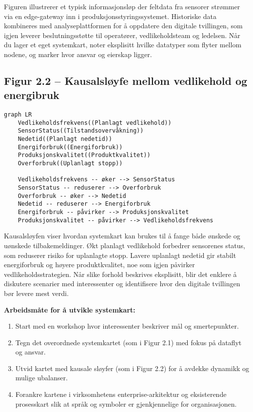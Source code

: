 Figuren illustrerer et typisk informasjonsløp der feltdata fra sensorer strømmer via en edge-gateway inn i produksjonsstyringssystemet. Historiske data kombineres med analyseplattformen for å oppdatere den digitale tvillingen, som igjen leverer beslutningsstøtte til operatører, vedlikeholdsteam og ledelsen. Når du lager et eget systemkart, noter eksplisitt hvilke datatyper som flyter mellom nodene, og marker hvor ansvar og eierskap ligger.

\subsection{Figur 2.2 -- Kausalsløyfe mellom vedlikehold og energibruk}
\begin{verbatim}
graph LR
    Vedlikeholdsfrekvens((Planlagt vedlikehold))
    SensorStatus((Tilstandsovervåkning))
    Nedetid((Planlagt nedetid))
    Energiforbruk((Energiforbruk))
    Produksjonskvalitet((Produktkvalitet))
    Overforbruk((Uplanlagt stopp))

    Vedlikeholdsfrekvens -- øker --> SensorStatus
    SensorStatus -- reduserer --> Overforbruk
    Overforbruk -- øker --> Nedetid
    Nedetid -- reduserer --> Energiforbruk
    Energiforbruk -- påvirker --> Produksjonskvalitet
    Produksjonskvalitet -- påvirker --> Vedlikeholdsfrekvens
\end{verbatim}

Kausalsløyfen viser hvordan systemkart kan brukes til å fange både ønskede og uønskede tilbakemeldinger. Økt planlagt vedlikehold forbedrer sensorenes status, som reduserer risiko for uplanlagte stopp. Lavere uplanlagt nedetid gir stabilt energiforbruk og høyere produktkvalitet, noe som igjen påvirker vedlikeholdsstrategien. Når slike forhold beskrives eksplisitt, blir det enklere å diskutere scenarier med interessenter og identifisere hvor den digitale tvillingen bør levere mest verdi.

\textbf{Arbeidsmåte for å utvikle systemkart:}
\begin{enumerate}
    \item Start med en workshop hvor interessenter beskriver mål og smertepunkter.
    \item Tegn det overordnede systemkartet (som i Figur 2.1) med fokus på dataflyt og ansvar.
    \item Utvid kartet med kausale sløyfer (som i Figur 2.2) for å avdekke dynamikk og mulige ubalanser.
    \item Forankre kartene i virksomhetens enterprise-arkitektur og eksisterende prosesskart slik at språk og symboler er gjenkjennelige for organisasjonen.
\end{enumerate}


